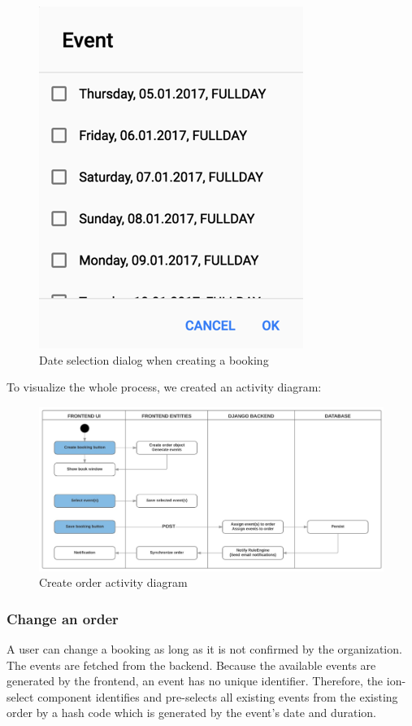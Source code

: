 \documentclass[11pt]{article} %
\begin{document}
\begin{figure}[H]
\begin{center}
\includegraphics[]{event_creation}
\end{center}
\caption{Date selection dialog when creating a booking}
\label{fig:event_creation}
\end{figure}
\newpage
To visualize the whole process, we created an activity diagram:
\begin{figure}[H]
\begin{center}
\includegraphics[width=1.0\textwidth]{order_post_activity_diagram}
\end{center}
\caption{Create order activity diagram}
\label{fig:order_post_activity_diagram}
\end{figure}


\subsubsection{Change an order}
A user can change a booking as long as it is not confirmed by the organization. The events are fetched from the backend. Because the available events are generated by the frontend, an event has no unique identifier. Therefore, the ion-select component identifies and pre-selects all existing events from the existing order by a hash code which is generated by the event’s date and duration.
\end{document}
